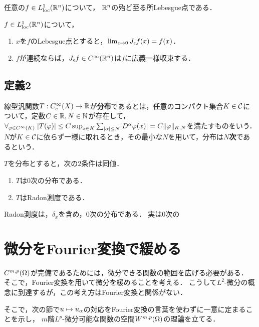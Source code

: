 \documentclass[uplatex,dvipdfmx]{jsreport}
\begin{document}
\begin{theorem}
    任意の$f\in L^1_{\mathrm{loc}}(\mathbb{R}^n)$について，
    $\mathbb{R}^n$の殆ど至る所Lebesgue点である．
\end{theorem}

\begin{theorem}
    $f\in L^1_{\mathrm{loc}}(\mathbb{R}^n)$について，
    \begin{enumerate}
        \item $x$を$f$のLebesgue点とすると，$\lim_{\epsilon\to0}J_\epsilon f(x)=f(x)$．
        \item $f$が連続ならば，$J_\epsilon f\in C^\infty(\mathbb{R}^n)$は$f$に広義一様収束する．
    \end{enumerate}
\end{theorem}

\subsection{定義2}

\begin{definition}
    線型汎関数$T:C^\infty_c(X)\to\mathbb{R}$が\textbf{分布}であるとは，任意のコンパクト集合$K\in\mathcal{C}$について，定数$C\in\mathbb{R},N\in\mathbb{N}$が存在して，$\forall_{\varphi\in C^\infty(K)}\;\lvert T(\varphi)\rvert\le C\sup_{x\in K}\sum_{\lvert\alpha\rvert\le N}\lvert D^\alpha\varphi(x)\rvert=C\|\varphi\|_{K,N}$を満たすものをいう．
    $N$が$K\in\mathcal{C}$に依らず一様に取れるとき，その最小な$N$を用いて，分布は\textbf{$N$次}であるという．
\end{definition}

\begin{theorem}
    $T$を分布とすると，次の2条件は同値．
    \begin{enumerate}
        \item $T$は$0$次の分布である．
        \item $T$はRadon測度である．
    \end{enumerate}
\end{theorem}

\begin{example}
    Radon測度は，$\delta_x$を含め，$0$次の分布である．
    実は$0$次の
\end{example}

\section{微分をFourier変換で緩める}

\begin{tcolorbox}[colframe=ForestGreen, colback=ForestGreen!10!white,breakable,colbacktitle=ForestGreen!40!white,coltitle=black,fonttitle=\bfseries\sffamily,
title=]
    $C^{m,p}(\Omega)$が完備であるためには，微分できる関数の範囲を広げる必要がある．
    そこで，Fourier変換を用いて微分を緩めることを考える．
    こうして$L^2$-微分の概念に到達するが，この考え方はFourier変換と関係がない．
    
    そこで，次の節で$u\mapsto u_\alpha$の対応をFourier変換の言葉を使わずに一意に定まることを示し，
    $m$階$L^p$-微分可能な関数の空間$W^{m,p}(\Omega)$の理論を立てる．
\end{tcolorbox}
\end{document}
